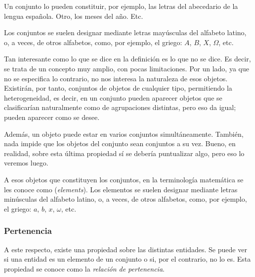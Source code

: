 Un conjunto lo pueden constituir, por ejemplo, las letras del abecedario de
la lengua española. Otro, los meses del año. Etc.

Los conjuntos se suelen designar mediante letras mayúsculas del alfabeto
latino, o, a veces, de otros alfabetos, como, por ejemplo, el griego: $A$,
$B$, $X$, $\Omega$, etc.

Tan interesante como lo que se dice en la definición es lo que no se dice.
Es decir, se trata de un concepto muy amplio, con pocas limitaciones. Por un
lado, ya que no se especifica lo contrario, no nos interesa la naturaleza de
esos objetos. Existirán, por tanto, conjuntos de objetos de cualquier tipo,
permitiendo la heterogeneidad, es decir, en un conjunto pueden aparecer
objetos que se clasificarían naturalmente como de agrupaciones distintas,
pero eso da igual; pueden aparecer como se desee.

Además, un objeto puede estar en varios conjuntos simultáneamente. También,
nada impide que los objetos del conjunto sean conjuntos a su vez. Bueno, en
realidad, sobre esta última propiedad sí se debería puntualizar algo, pero
eso lo veremos luego.

A esos objetos que constituyen los conjuntos, en la terminología matemática
se les conoce como  (\emph{elements}). Los elementos se
suelen designar mediante letras minúsculas del alfabeto latino, o, a veces,
de otros alfabetos, como, por ejemplo, el griego: $a$, $b$, $x$, $\omega$,
etc.





\subsubsection{Pertenencia}

A este respecto, existe una propiedad sobre las distintas entidades. Se
puede ver si una entidad es un elemento de un conjunto o si, por el
contrario, no lo es. Esta propiedad se conoce como la \emph{relación de
pertenencia}.\footnotemark


